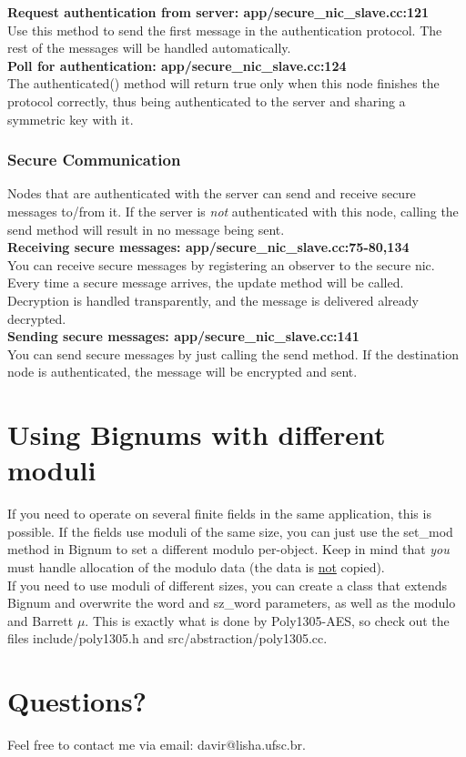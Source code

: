 \documentclass[a4paper,10pt]{article}   %
\begin{document}
		\textbf{Request authentication from server: app/secure\_nic\_slave.cc:121}\\
		\indent Use this method to send the first message in the authentication protocol. The rest of the messages will be handled automatically.\\ 

		\textbf{Poll for authentication: app/secure\_nic\_slave.cc:124}\\
		\indent The authenticated() method will return true only when this node finishes the protocol correctly, thus being authenticated to the server and sharing a symmetric key with it.\\

	\subsubsection{Secure Communication}
	Nodes that are authenticated with the server can send and receive secure messages to/from it. If the server is \emph{not} authenticated with this node, calling the send method will result in no message being sent.\\

		\textbf{Receiving secure messages: app/secure\_nic\_slave.cc:75-80,134}\\
		\indent You can receive secure messages by registering an observer to the secure nic. Every time a secure message arrives, the update method will be called. Decryption is handled transparently, and the message is delivered already decrypted.\\

		\textbf{Sending secure messages: app/secure\_nic\_slave.cc:141}\\
		\indent You can send secure messages by just calling the send method. If the destination node is authenticated, the message will be encrypted and sent.\\

		\section{Using Bignums with different moduli}
		If you need to operate on several finite fields in the same application, this is possible. If the fields use moduli of the same size, you can just use the set\_mod method in Bignum to set a different modulo per-object. Keep in mind that \emph{you} must handle allocation of the modulo data (the data is \underline{not} copied).\\
		\indent If you need to use moduli of different sizes, you can create a class that extends Bignum and overwrite the word and sz\_word parameters, as well as the modulo and Barrett $\mu$. This is exactly what is done by Poly1305-AES, so check out the files include/poly1305.h and src/abstraction/poly1305.cc.\\

	\section{Questions?}
		Feel free to contact me via email: davir@lisha.ufsc.br.

		
		
\end{document}
